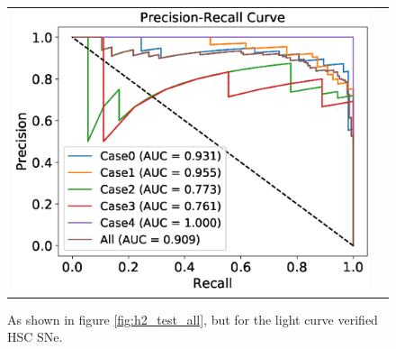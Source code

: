 \documentclass[useamsfonts]{pasj01}
\begin{document}
\begin{figure}[htbp]
\begin{tabular}{cc}
\begin{minipage}{0.5\hsize}
\begin{center}
                \includegraphics[width=\columnwidth]{figures/10_absolute-magnitude-scaled-flux-remove-y_SNdata_test_190522_PreRec_noedge_spec.eps}
            \end{center}
        \end{minipage}
    \end{tabular}
    \vspace{2mm}
    \caption{%
  As shown in figure \ref{fig:h2_test_all}, but for the light curve verified HSC SNe. 
}%
    \label{fig:h2_test_gold}
\end{figure}
%
%
%
%
%
%
\end{document}
